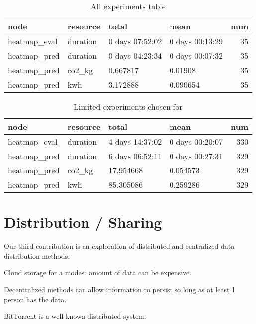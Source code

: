 \documentclass[10pt,twocolumn,letterpaper]{article}
\begin{document}
\begin{table*}[t]
\begin{tabular}{llllr}
\toprule
        node & resource &           total &            mean &  num \\
\midrule
heatmap\_eval & duration & 0 days 07:52:02 & 0 days 00:13:29 &   35 \\
heatmap\_pred & duration & 0 days 04:23:34 & 0 days 00:07:32 &   35 \\
heatmap\_pred &   co2\_kg &        0.667817 &         0.01908 &   35 \\
heatmap\_pred &      kwh &        3.172888 &        0.090654 &   35 \\
\bottomrule
\end{tabular}
\caption{All experiments table}
\end{table*}


\begin{table*}[t]
\begin{tabular}{llllr}
\toprule
        node & resource &           total &            mean &  num \\
\midrule
heatmap\_eval & duration & 4 days 14:37:02 & 0 days 00:20:07 &  330 \\
heatmap\_pred & duration & 6 days 06:52:11 & 0 days 00:27:31 &  329 \\
heatmap\_pred &   co2\_kg &       17.954668 &        0.054573 &  329 \\
heatmap\_pred &      kwh &       85.305086 &        0.259286 &  329 \\
\bottomrule
\end{tabular}
\caption{Limited experiments chosen for}
\end{table*}


\section{Distribution / Sharing}


Our third contribution is an exploration of distributed and centralized data distribution methods. 

Cloud storage for a modest amount of data can be expensive.

Decentralized methods can allow information to persist so long as at least 1
person has the data.

BitTorrent is a well known distributed system.
\end{document}
